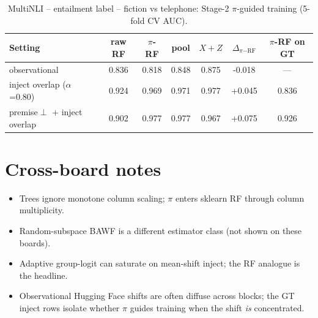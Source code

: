 \documentclass[11pt]{article}
\begin{document}
\begin{table}[t]
\centering
\small
\caption{MultiNLI  --  entailment label  --  fiction vs telephone: Stage-2 $\pi$-guided training (5-fold CV AUC).}
\begin{tabular}{lcccccc}
\toprule
Setting & raw RF & $\pi$-RF & pool & $X{+}Z$ & $\Delta_{\pi\mathrm{-RF}}$ & $\pi$-RF on GT \\
\midrule
observational & 0.836 & 0.818 & 0.848 & 0.875 & -0.018 & --- \\
inject overlap ($\alpha$=0.80) & 0.924 & 0.969 & 0.971 & 0.977 & +0.045 & 0.836 \\
premise$\perp$ + inject overlap & 0.902 & 0.977 & 0.977 & 0.967 & +0.075 & 0.926 \\
\bottomrule
\end{tabular}
\end{table}



\section{Cross-board notes}
\begin{itemize}
\item Trees ignore monotone column scaling; $\pi$ enters sklearn RF through column multiplicity.
\item Random-subspace BAWF is a different estimator class (not shown on these boards).
\item Adaptive group-logit can saturate on mean-shift inject; the RF analogue is the headline.
\item Observational Hugging Face shifts are often diffuse across blocks; the GT inject rows isolate whether $\pi$ guides training when the shift \emph{is} concentrated.
\end{itemize}
\end{document}
